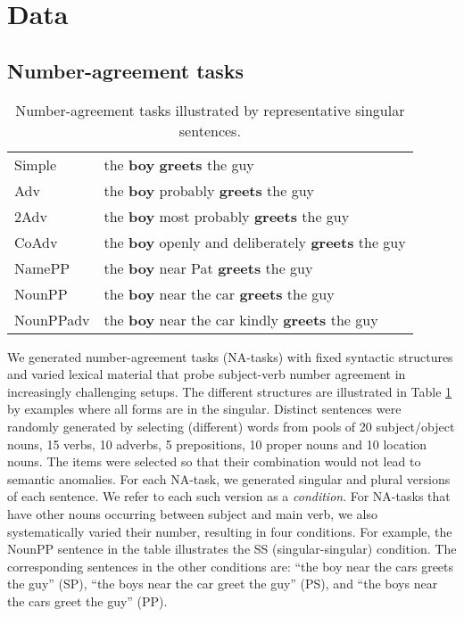 \section{Data}
\subsection{Number-agreement tasks}

\begin{table}[tb]
  \centering
  \begin{footnotesize}
  \begin{tabular}{l@{\hskip1pt}l}
    \B Simple & the \textbf{boy} \textbf{greets} the guy\\
    \B Adv & the \textbf{boy} probably \textbf{greets} the guy\\
    \B 2Adv & the \textbf{boy} most probably \textbf{greets} the guy\\
    \B CoAdv &  the \textbf{boy} openly and deliberately \textbf{greets} the guy\\
    \B NamePP & the \textbf{boy} near Pat \textbf{greets} the guy\\
    \B NounPP & the \textbf{boy} near the car \textbf{greets} the guy\\
    \B NounPPadv & the \textbf{boy} near the car kindly \textbf{greets} the guy\\
  \end{tabular}
  \end{footnotesize}
  \caption{Number-agreement tasks illustrated by representative
    singular sentences.}
  \label{tab:data-sets}
\end{table}

We generated number-agreement tasks (NA-tasks) with fixed syntactic structures and varied lexical material that probe subject-verb number agreement in increasingly challenging setups. 
The different structures are illustrated in Table \ref{tab:data-sets} by examples where all forms are in the singular. 
Distinct sentences were randomly generated by selecting (different) words from pools of 20 subject/object nouns, 15 verbs, 10 adverbs, 5 prepositions, 10 proper nouns and 10 location nouns. 
The items were selected so that their combination would not lead to semantic anomalies.
For each NA-task, we generated singular and plural versions of each sentence. 
We refer to each such version as a \textit{condition}. 
For NA-tasks that have other nouns occurring between subject and main verb, we also systematically varied their number, resulting in four conditions. 
For example, the NounPP sentence in the table illustrates the SS (singular-singular) condition. 
The corresponding sentences in the other conditions are: ``the boy near the cars greets the guy'' (SP), ``the boys near the car greet the guy'' (PS), and ``the boys near the cars greet the guy'' (PP).

